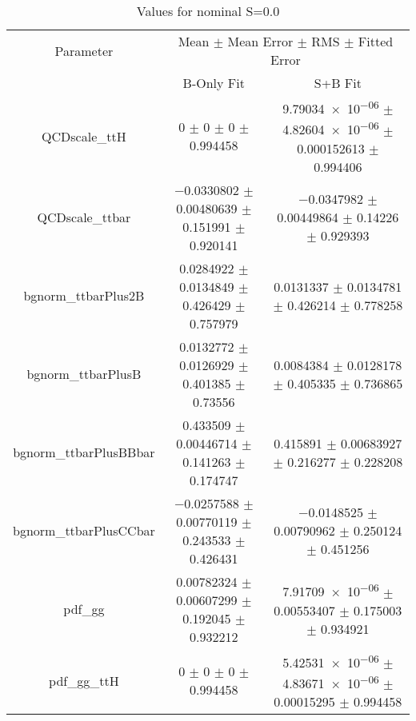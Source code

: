 \begin{table}
\centering
\caption{Values for nominal S=0.0}
\begin{tabular}{ccc}
\toprule
Parameter & \multicolumn{2}{c}{Mean $\pm$ Mean Error $\pm$ RMS $\pm$ Fitted Error}\\
 & B-Only Fit & S+B Fit\\
\midrule
QCDscale\_ttH & \num{0} $\pm$ \num{0} $\pm$ \num{0} $\pm$ \num{0.994458} & \num{9.79034e-06} $\pm$ \num{4.82604e-06} $\pm$ \num{0.000152613} $\pm$ \num{0.994406}\\
QCDscale\_ttbar & \num{-0.0330802} $\pm$ \num{0.00480639} $\pm$ \num{0.151991} $\pm$ \num{0.920141} & \num{-0.0347982} $\pm$ \num{0.00449864} $\pm$ \num{0.14226} $\pm$ \num{0.929393}\\
bgnorm\_ttbarPlus2B & \num{0.0284922} $\pm$ \num{0.0134849} $\pm$ \num{0.426429} $\pm$ \num{0.757979} & \num{0.0131337} $\pm$ \num{0.0134781} $\pm$ \num{0.426214} $\pm$ \num{0.778258}\\
bgnorm\_ttbarPlusB & \num{0.0132772} $\pm$ \num{0.0126929} $\pm$ \num{0.401385} $\pm$ \num{0.73556} & \num{0.0084384} $\pm$ \num{0.0128178} $\pm$ \num{0.405335} $\pm$ \num{0.736865}\\
bgnorm\_ttbarPlusBBbar & \num{0.433509} $\pm$ \num{0.00446714} $\pm$ \num{0.141263} $\pm$ \num{0.174747} & \num{0.415891} $\pm$ \num{0.00683927} $\pm$ \num{0.216277} $\pm$ \num{0.228208}\\
bgnorm\_ttbarPlusCCbar & \num{-0.0257588} $\pm$ \num{0.00770119} $\pm$ \num{0.243533} $\pm$ \num{0.426431} & \num{-0.0148525} $\pm$ \num{0.00790962} $\pm$ \num{0.250124} $\pm$ \num{0.451256}\\
pdf\_gg & \num{0.00782324} $\pm$ \num{0.00607299} $\pm$ \num{0.192045} $\pm$ \num{0.932212} & \num{7.91709e-06} $\pm$ \num{0.00553407} $\pm$ \num{0.175003} $\pm$ \num{0.934921}\\
pdf\_gg\_ttH & \num{0} $\pm$ \num{0} $\pm$ \num{0} $\pm$ \num{0.994458} & \num{5.42531e-06} $\pm$ \num{4.83671e-06} $\pm$ \num{0.00015295} $\pm$ \num{0.994458}\\
\bottomrule
\end{tabular}
\end{table}